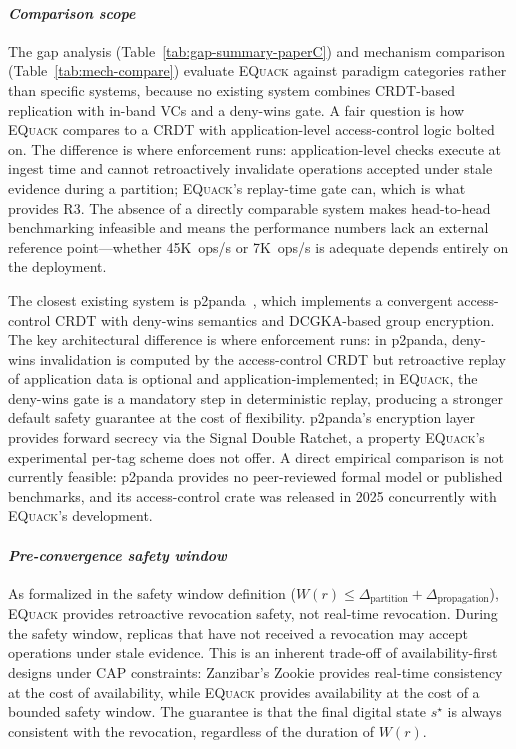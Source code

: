 \documentclass[10pt,journal,compsoc]{IEEEtran}
\newcommand{\equack}{\textsc{EQuack}}
\begin{document}
\paragraph*{\textit{Comparison scope}}
The gap analysis (Table~\ref{tab:gap-summary-paperC}) and mechanism comparison (Table~\ref{tab:mech-compare}) evaluate \equack{} against paradigm categories rather than specific systems, because no existing system combines CRDT-based replication with in-band VCs and a deny-wins gate. A fair question is how \equack{} compares to a CRDT with application-level access-control logic bolted on. The difference is where enforcement runs: application-level checks execute at ingest time and cannot retroactively invalidate operations accepted under stale evidence during a partition; \equack{}'s replay-time gate can, which is what provides R3. The absence of a directly comparable system makes head-to-head benchmarking infeasible and means the performance numbers lack an external reference point---whether 45K~ops/s or 7K~ops/s is adequate depends entirely on the deployment.

The closest existing system is
p2panda~\cite{p2panda2024,p2panda_auth2025}, which implements a
convergent access-control CRDT with deny-wins semantics and
DCGKA-based group encryption. The key architectural difference is
where enforcement runs: in p2panda, deny-wins invalidation is
computed by the access-control CRDT but retroactive replay of
application data is optional and application-implemented; in
\equack{}, the deny-wins gate is a mandatory step in deterministic
replay, producing a stronger default safety guarantee at the cost
of flexibility. p2panda's encryption layer provides forward
secrecy via the Signal Double Ratchet, a property \equack{}'s
experimental per-tag scheme does not offer. A direct empirical
comparison is not currently feasible: p2panda provides no
peer-reviewed formal model or published benchmarks, and its
access-control crate was released in 2025 concurrently with
\equack{}'s development.

\paragraph*{\textit{Pre-convergence safety window}}
As formalized in the safety window definition ($W(r) \leq \Delta_{\text{partition}} + \Delta_{\text{propagation}}$), \equack{} provides retroactive revocation safety, not real-time revocation. During the safety window, replicas that have not received a revocation may accept operations under stale evidence. This is an inherent trade-off of availability-first designs under CAP constraints: Zanzibar's Zookie provides real-time consistency at the cost of availability, while \equack{} provides availability at the cost of a bounded safety window. The guarantee is that the final digital state $s^\star$ is always consistent with the revocation, regardless of the duration of $W(r)$.
\end{document}
